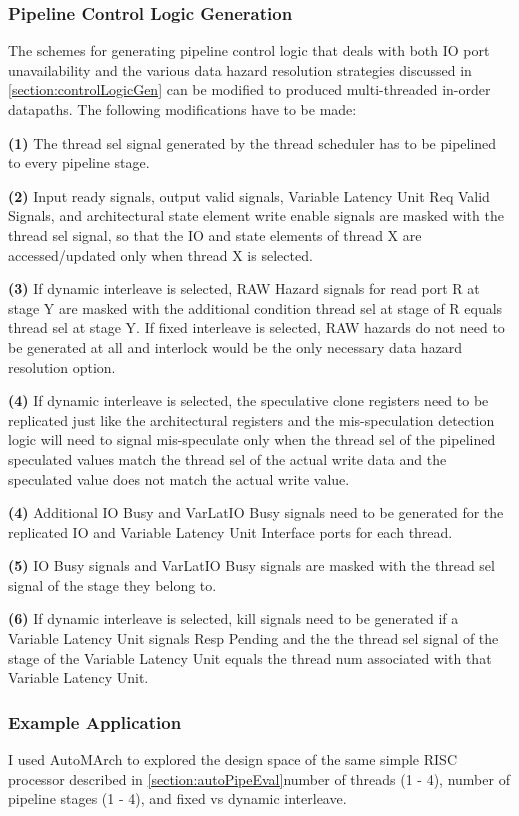 \subsubsection{Pipeline Control Logic Generation}
The schemes for generating pipeline control logic that deals with both IO port unavailability and the various data hazard resolution strategies discussed in \ref{section:controlLogicGen} can be modified to produced multi-threaded in-order datapaths. The following modifications have to be made:

{\bf (1)} The thread sel signal generated by the thread scheduler has to be pipelined to every pipeline stage.

{\bf (2)} Input ready signals, output valid signals, Variable Latency Unit Req Valid Signals, and architectural state element write enable signals are masked with the thread sel signal, so that the IO and state elements of thread X are accessed/updated only when thread X is selected.

{\bf (3)} If dynamic interleave is selected, RAW Hazard signals for read port R at stage Y are masked with the additional condition thread sel at stage of R equals thread sel at stage Y. If fixed interleave is selected, RAW hazards do not need to be generated at all and interlock would be the only necessary data hazard resolution option.

{\bf (4)} If dynamic interleave is selected, the speculative clone registers need to be replicated just like the architectural registers and the mis-speculation detection logic will need to signal mis-speculate only when the thread sel of the pipelined speculated values match the thread sel of the actual write data and the speculated value does not match the actual write value.

{\bf (4)} Additional IO Busy and VarLatIO Busy signals need to be generated for the replicated IO and Variable Latency Unit Interface ports for each thread.

{\bf (5)} IO Busy signals and VarLatIO Busy signals are masked with the thread sel signal of the stage they belong to.

{\bf (6)} If dynamic interleave is selected, kill signals need to be generated if a Variable Latency Unit signals Resp Pending and the the thread sel signal of the stage of the Variable Latency Unit equals the thread num associated with that Variable Latency Unit.

\subsubsection{Example Application}
I used AutoMArch to explored the design space of the same simple RISC processor described in \ref{section:autoPipeEval}number of threads (1 - 4), number of pipeline stages (1 - 4), and fixed vs dynamic interleave. 

